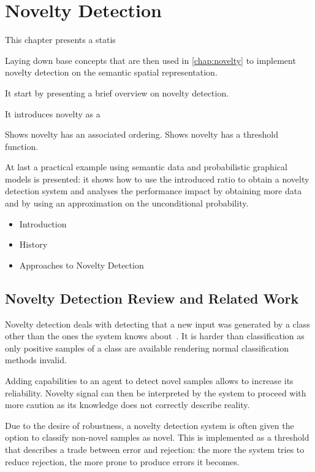 \chapter{Novelty Detection}\label{chap:novelty-intro}

This chapter presents a statis

Laying down base concepts that are then used in \autoref{chap:novelty} to
implement novelty detection on the semantic spatial representation.

It start by presenting a brief overview on novelty detection.

It introduces novelty as a 

Shows novelty has an associated ordering.
Shows novelty has a threshold function.


At last a practical example using semantic data and probabilistic graphical
models is presented: it shows how to use the introduced ratio to obtain a
novelty detection system and analyses the performance impact by obtaining more
data and by using an approximation on the unconditional probability.


\begin{itemize}
\item Introduction
\item History
\item Approaches to Novelty Detection
\end{itemize}

\section{Novelty Detection Review and Related Work}
Novelty detection deals with detecting that a new input was generated by a class
other than the ones the system knows about~\cite{markou2003novelty}.
It is harder than classification as only positive samples of a class are available
rendering normal classification methods invalid.

Adding capabilities to an agent to detect novel samples allows to increase its
reliability. Novelty signal can then be interpreted by the system to proceed
with more caution as its knowledge does not correctly describe reality.

Due to the desire of robustness, a novelty detection system is often given the option
to classify non-novel samples as novel. This is implemented as a threshold that describes a trade
between error and rejection: the more the system tries to reduce rejection, the more
prone to produce errors it becomes.



